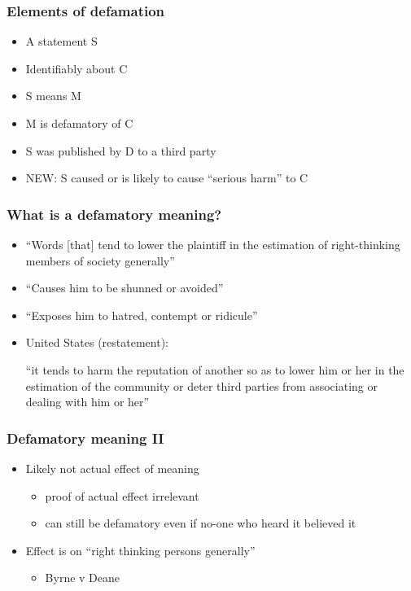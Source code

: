 \documentclass[ignorenonframetext,]{beamer}
\begin{document}
\begin{frame}
\frametitle{Elements of defamation}

\begin{itemize}
\item  A statement S
\item  Identifiably about C
\item  S means M
\item  M is defamatory of C
\item  S was published by D to a third party
\item  NEW: S caused or is likely to cause ``serious harm'' to C
\end{itemize}

\end{frame}

\begin{frame}
\frametitle{What is a defamatory meaning?}

\begin{itemize}
\item ``Words [that] tend to lower the plaintiff in the estimation of right-thinking members of society generally''
\item  ``Causes him to be shunned or avoided''
\item  ``Exposes him to hatred, contempt or ridicule''
\item  United States (restatement):

    ``it tends to harm the reputation of another so as to lower him or
    her in the estimation of the community or deter third parties from
    associating or dealing with him or her''

\end{itemize}

\end{frame}

\begin{frame}
\frametitle{Defamatory meaning II}

\begin{itemize}
\item  {Likely} not {actual} effect of meaning

  \begin{itemize}
  \item    proof of actual effect irrelevant
  \item    can still be defamatory even if no-one who heard it believed
    it
  \end{itemize}
\item  Effect is on ``right thinking persons generally''

  \begin{itemize}
  \item    Byrne v Deane
  \end{itemize}
\end{itemize}

~


\end{frame}
\end{document}
